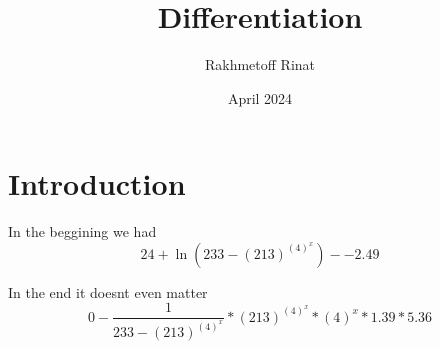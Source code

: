 \documentclass{article}
\title{Differentiation}
\author{Rakhmetoff Rinat }
\date{April 2024}
\begin{document}
\maketitle
\section{Introduction}
In the beggining we had
\begin {equation}
24 + \ln(233 - (213) ^ {(4) ^ {x}}) - -2.49
\end {equation}


In the end it doesnt even matter
\begin {equation}
0 - \frac {1} {233 - (213) ^ {(4) ^ {x}}} * (213) ^ {(4) ^ {x}} * (4) ^ {x} * 1.39 * 5.36
\end {equation}
\end{document}
